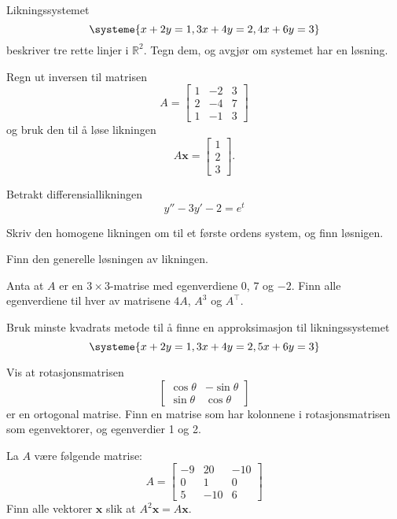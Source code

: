 \documentclass[titlepage,a4paper,12pt,norsk]{IMFeksamen}
\DeclareMathOperator{\Sp}{Sp}
\newcommand{\tr}{^\top}
\newcommand{\V}[1]{\mathbf{#1}}
\newcommand{\vvv}[3]{\begin{bmatrix} #1 \\ #2 \\ #3 \end{bmatrix}}
\newcommand{\x}{\V{x}}
\newcommand{\0}{\V{0}}
\begin{document}
\begin{oppgave}
Likningssystemet 
\[
\systeme{
x + 2y = 1,
3x + 4y = 2,
4x + 6y = 3
}
\]
beskriver tre rette linjer i $\mathbb R^2$. Tegn dem, og avgjør om systemet har en løsning.
\end{oppgave}


\begin{oppgave}
Regn ut inversen til matrisen
\[
A =
\begin{bmatrix}
1 & -2 & 3 \\
2 & -4 & 7 \\
1 & -1 & 3
\end{bmatrix}
\]
og bruk den til å løse likningen
\[
A \x = \vvv{1}{2}{3}.
\]
\end{oppgave}


\begin{oppgave}
Betrakt differensiallikningen
\[
y''-3y'-2=e^t
\]
\begin{punkt}
Skriv den homogene likningen om til et første ordens system, og finn løsnigen. 
\end{punkt}
\begin{punkt}
Finn den generelle løsningen av likningen.
\end{punkt}
\end{oppgave}


\begin{oppgave}
Anta at $A$ er en $3 \times 3$-matrise med egenverdiene $0$, $7$ og $-2$.
Finn alle egenverdiene til hver av matrisene $4A$, $A^3$ og $A\tr$.
\end{oppgave}


\begin{oppgave}
Bruk minste kvadrats metode til å finne en approksimasjon til likningssystemet
\[
\systeme{
x + 2y = 1,
3x + 4y = 2,
5x + 6y = 3
}
\]
\end{oppgave}


\begin{oppgave}
Vis at rotasjonsmatrisen 
\[
\begin{bmatrix}
\cos \theta  & -\sin \theta  \\  \sin \theta & \cos \theta 
\end{bmatrix}
\]
er en ortogonal matrise.  Finn en matrise som har kolonnene i rotasjonsmatrisen som egenvektorer, og egenverdier 1 og 2. \\
\end{oppgave}


\begin{oppgave}
La $A$ være følgende matrise:
\[
A =
\begin{bmatrix}
-9 &  20 & -10 \\
 0 &   1 &   0 \\
 5 & -10 &   6
\end{bmatrix}
\]
Finn alle vektorer $\x$ slik at $A^2 \x = A \x$.
\end{oppgave}
\end{document}
